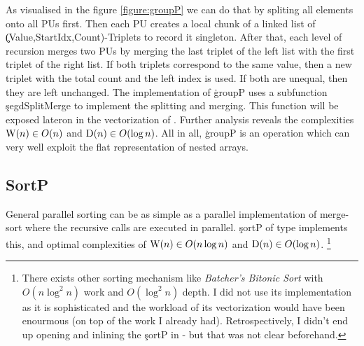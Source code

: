     As visualised in the figure \ref{figure:groupP}
    we can do that by spliting all elements onto all PUs first.
    Then each PU creates a local chunk of a linked list of
    \c{(Value,StartIdx,Count)}-Triplets to record it singleton.
    After that, each level of recursion merges two PUs by
    merging the last triplet of the left list with the first triplet
    of the right list. If both triplets correspond to the same value,
    then a new triplet with the total count and the left index is used.
    If both are unequal, then they are left unchanged. The implementation
    of \c{groupP} uses a subfunction \c{segdSplitMerge} to implement the
    splitting and merging. This function will be exposed lateron in
    the vectorization of \ndpn.
    Further analysis reveals the complexities $\textrm{W}(n) \in O(n)$ and $\textrm{D}(n) \in O(\log n)$.
    All in all, \c{groupP} is an operation which can very well exploit the flat representation of nested arrays.
    
  \subsection{SortP}
    General parallel sorting can be as simple as a parallel
    implementation of merge-sort where the recursive calls are executed
    in parallel. \c{sortP} of type \type{[:Int:] -> [:Int:]} implements this,
    and optimal complexities of $\textrm{W}(n) \in O(n \log n)$
    and $\textrm{D}(n) \in O(\log n)$.
    \footnote{There exists other sorting mechanism
    like \emph{Batcher's Bitonic Sort} with $O(n \log^2 n)$ work and $O(\log^2 n)$
    depth. I did not use its implementation as it is sophisticated and
    the workload of its vectorization would have been enourmous (on top of the work I already had).
    Retrospectively, I didn't end up opening and inlining the \c{sortP} in \ndpn - but that
    was not clear beforehand.
    }

